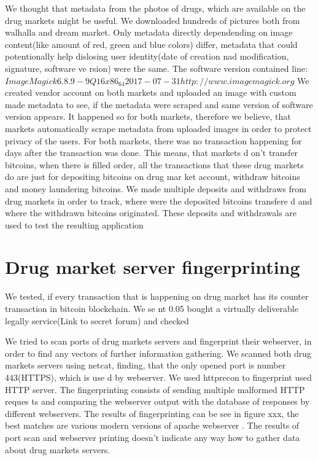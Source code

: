 \documentclass[
  digital, %
  table,   %
  lof,     %
  lot,     %
  oneside
]{fithesis3}
\begin{document}
We thought that metadata from the photos of drugs, which are available on the drug markets might be useful.
We downloaded hundreds of pictures both from walhalla and dream market.
Only metadata directly dependending on image content(like amount of red, green and blue colors) differ,
metadata that could potentionally help dislosing user identity(date of creation nad modification, signature, software ve
rsion) were the same.
The software version contained line: $ImageMagick 6.8.9-9 Q16 x86_64 2017-07-31 http://www.imagemagick.org$
We created vendor account on both markets and uploaded an image with custom made metadata to see,
if the metadata were scraped and same version of software version appears. It happened so for both markets,
therefore we believe, that markets automatically scrape metadata from uploaded images in order to protect privacy of the
 users.
For both markets, there was no transaction happening for days after the transaction was done. This means, that markets d
on't transfer bitcoins,
when there is filled order, all the transactions that these drug markets do are just for depositing bitcoins on drug mar
ket account,
withdraw bitcoins and money laundering bitcoins.
We made multiple deposits and withdraws from drug markets in order to track, where were the deposited bitcoins transfere
d and where the withdrawn bitcoins originated.
These deposits and withdrawals are used to test the resulting application
\section{Drug market server fingerprinting}

We tested, if every transaction that is happening on drug market has its counter transaction in bitcoin blockchain.
We se
nt 0.05 bought a virtually deliverable legally service(Link to secret forum) and checked

We tried to scan ports of drug markets servers and fingerprint their webserver, in order to find any vectors of further 
information gathering.
We scanned both drug markets servers using netcat, finding, that the only opened port is number 443(HTTPS), which is use
d by webserver.
We used httprecon to fingerprint used HTTP server. The fingerprinting consists of sending multiple malformed HTTP reques
ts and comparing the webserver output with the database of responses by different webservers.
The results of fingerprinting can be see in figure xxx, the best matches are various modern versions of apache webserver
.
The results of port scan and webserver printing doesn't indicate any way how to gather data about drug markets servers.
\end{document}
